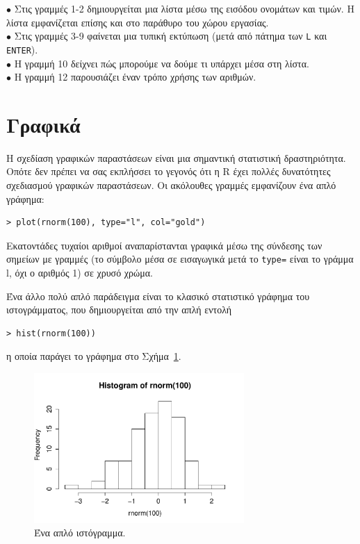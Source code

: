 \documentclass[a4paper,10pt,twocolumn]{article}
\begin{document}
\noindent $\bullet$ Στις γραμμές 1-2 δημιουργείται μια λίστα μέσω της εισόδου ονομάτων και τιμών. Η λίστα
εμφανίζεται επίσης και στο παράθυρο του χώρου εργασίας.\\
\noindent $\bullet$ Στις γραμμές 3-9 φαίνεται μια τυπική εκτύπωση (μετά από πάτημα των \texttt{L} και
\texttt{ENTER}). \\
\noindent $\bullet$ Η γραμμή 10 δείχνει πώς μπορούμε να δούμε τι υπάρχει μέσα στη λίστα.\\
\noindent $\bullet$ Η γραμμή 12 παρουσιάζει έναν τρόπο χρήσης των αριθμών. \\


\section{Γραφικά}
\label{sec:some-plotting}

Η σχεδίαση γραφικών παραστάσεων είναι μια σημαντική στατιστική δραστηριότητα. Οπότε δεν πρέπει να σας εκπλήσσει
το γεγονός ότι η R έχει πολλές δυνατότητες σχεδιασμού γραφικών παραστάσεων. Οι ακόλουθες γραμμές εμφανίζουν ένα
απλό γράφημα:

\begin{Verbatim}[frame=single,gobble=0]
> plot(rnorm(100), type="l", col="gold")
\end{Verbatim}

\noindent Εκατοντάδες τυχαίοι αριθμοί αναπαρίστανται γραφικά μέσω της σύνδεσης των σημείων με γραμμές (το 
σύμβολο μέσα σε εισαγωγικά μετά το \texttt{type=} είναι το γράμμα l, όχι ο αριθμός 1) σε χρυσό χρώμα.

Ένα άλλο πολύ απλό παράδειγμα είναι το κλασικό στατιστικό γράφημα του ιστογράμματος, που δημιουργείται από
την απλή εντολή

\begin{Verbatim}[frame=single,gobble=0]
  > hist(rnorm(100))
\end{Verbatim}

η οποία παράγει το γράφημα στο Σχήμα~\ref{fig:hist}.

\begin{figure}[h]
  \centering
  \includegraphics[width=8cm]{img/hist.pdf}
  \caption{Ένα απλό ιστόγραμμα.}
  \label{fig:hist}
\end{figure}
\end{document}
